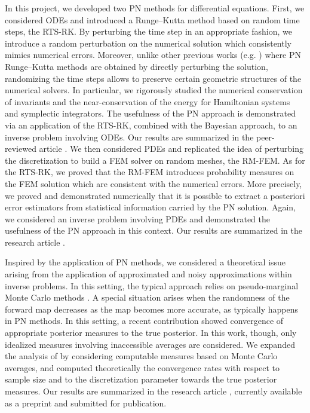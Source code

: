 \documentclass[10pt]{article}
\begin{document}
In this project, we developed two PN methods for differential equations. First, we considered ODEs and introduced a Runge--Kutta method based on random time steps, the RTS-RK. By perturbing the time step in an appropriate fashion, we introduce a random perturbation on the numerical solution which consistently mimics numerical errors. Moreover, unlike other previous works (e.g. \cite{CGS17}) where PN Runge--Kutta methods are obtained by directly perturbing the solution, randomizing the time steps allows to preserve certain geometric structures of the numerical solvers. In particular, we rigorously studied the numerical conservation of invariants and the near-conservation of the energy for Hamiltonian systems and symplectic integrators. The usefulness of the PN approach is demonstrated via an application of the RTS-RK, combined with the Bayesian approach, to an inverse problem involving ODEs. Our results are summarized in the peer-reviewed article \cite{AbG20}. We then considered PDEs and replicated the idea of perturbing the discretization to build a FEM solver on random meshes, the RM-FEM. As for the RTS-RK, we proved that the RM-FEM introduces probability measures on the FEM solution which are consistent with the numerical errors. More precisely, we proved and demonstrated numerically that it is possible to extract a posteriori error estimators from statistical information carried by the PN solution. Again, we considered an inverse problem involving PDEs and demonstrated the usefulness of the PN approach in this context. Our results are summarized in the research article \cite{AbG21}.

Inspired by the application of PN methods, we considered a theoretical issue arising from the application of approximated and noisy approximations within inverse problems. In this setting, the typical approach relies on pseudo-marginal Monte Carlo methods \cite{AnR09}. A special situation arises when the randomness of the forward map decreases as the map becomes more accurate, as typically happens in PN methods. In this setting, a recent contribution \cite{LST18} showed convergence of appropriate posterior measures to the true posterior. In this work, though, only idealized measures involving inaccessible averages are considered. We expanded the analysis of \cite{LST18} by considering computable measures based on Monte Carlo averages, and computed theoretically the convergence rates with respect to sample size and to the discretization parameter towards the true posterior measures. Our results are summarized in the research article \cite{Gar21b}, currently available as a preprint and submitted for publication.
\end{document}

